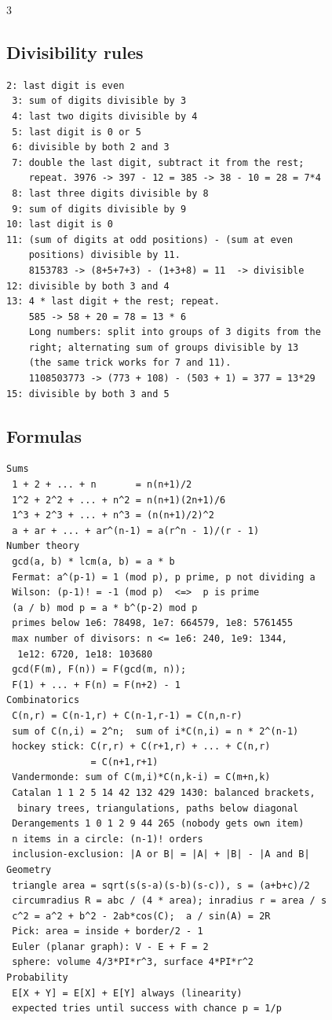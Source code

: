 \documentclass[8pt, a4paper]{article}
\begin{document}
\begin{multicols*}{3}
\subsection{Divisibility rules}
\begin{lstlisting}[language={}]
 2: last digit is even
 3: sum of digits divisible by 3
 4: last two digits divisible by 4
 5: last digit is 0 or 5
 6: divisible by both 2 and 3
 7: double the last digit, subtract it from the rest;
    repeat. 3976 -> 397 - 12 = 385 -> 38 - 10 = 28 = 7*4
 8: last three digits divisible by 8
 9: sum of digits divisible by 9
10: last digit is 0
11: (sum of digits at odd positions) - (sum at even
    positions) divisible by 11.
    8153783 -> (8+5+7+3) - (1+3+8) = 11  -> divisible
12: divisible by both 3 and 4
13: 4 * last digit + the rest; repeat.
    585 -> 58 + 20 = 78 = 13 * 6
    Long numbers: split into groups of 3 digits from the
    right; alternating sum of groups divisible by 13
    (the same trick works for 7 and 11).
    1108503773 -> (773 + 108) - (503 + 1) = 377 = 13*29
15: divisible by both 3 and 5
\end{lstlisting}
\subsection{Formulas}
\begin{lstlisting}[language={}]
Sums
 1 + 2 + ... + n       = n(n+1)/2
 1^2 + 2^2 + ... + n^2 = n(n+1)(2n+1)/6
 1^3 + 2^3 + ... + n^3 = (n(n+1)/2)^2
 a + ar + ... + ar^(n-1) = a(r^n - 1)/(r - 1)
Number theory
 gcd(a, b) * lcm(a, b) = a * b
 Fermat: a^(p-1) = 1 (mod p), p prime, p not dividing a
 Wilson: (p-1)! = -1 (mod p)  <=>  p is prime
 (a / b) mod p = a * b^(p-2) mod p
 primes below 1e6: 78498, 1e7: 664579, 1e8: 5761455
 max number of divisors: n <= 1e6: 240, 1e9: 1344,
  1e12: 6720, 1e18: 103680
 gcd(F(m), F(n)) = F(gcd(m, n));
 F(1) + ... + F(n) = F(n+2) - 1
Combinatorics
 C(n,r) = C(n-1,r) + C(n-1,r-1) = C(n,n-r)
 sum of C(n,i) = 2^n;  sum of i*C(n,i) = n * 2^(n-1)
 hockey stick: C(r,r) + C(r+1,r) + ... + C(n,r)
               = C(n+1,r+1)
 Vandermonde: sum of C(m,i)*C(n,k-i) = C(m+n,k)
 Catalan 1 1 2 5 14 42 132 429 1430: balanced brackets,
  binary trees, triangulations, paths below diagonal
 Derangements 1 0 1 2 9 44 265 (nobody gets own item)
 n items in a circle: (n-1)! orders
 inclusion-exclusion: |A or B| = |A| + |B| - |A and B|
Geometry
 triangle area = sqrt(s(s-a)(s-b)(s-c)), s = (a+b+c)/2
 circumradius R = abc / (4 * area); inradius r = area / s
 c^2 = a^2 + b^2 - 2ab*cos(C);  a / sin(A) = 2R
 Pick: area = inside + border/2 - 1
 Euler (planar graph): V - E + F = 2
 sphere: volume 4/3*PI*r^3, surface 4*PI*r^2
Probability
 E[X + Y] = E[X] + E[Y] always (linearity)
 expected tries until success with chance p = 1/p
\end{lstlisting}

\end{multicols*}
\end{document}

